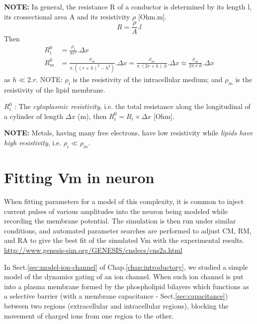 \begin{mdframed}

{\bf NOTE:} In general, the resistance R of a conductor is determined
by its length l, its crossectional area A and its resistivity $\rho$
[Ohm.m].
\begin{equation}
  R = \frac{\rho}{A}.l
\end{equation}
Then
\begin{equation}
  \label{eq:resistance}
  \begin{split}
R_i^0 &= \frac{\rho_i}{\pi r^2}.\Delta x \\
R_m^0 &= \frac{\rho_m}{\pi.((r+h)^2-h^2)}.\Delta x 
= \frac{\rho_m}{\pi.(2r+h).h}.\Delta x
\approx \frac{\rho_m}{2\pi.r.h}.\Delta x
\end{split}
\end{equation}
as $h \ll 2.r$. NOTE: $\rho_i$ is the resistivity of the intracellular medium;
and $\rho_m$ is the resistivity of the lipid membrane.

$R_i^0$ : The  {\it cytoplasmic resistivity}, i.e. the total resistance along
the longitudinal of a cylinder of length $\Delta x$ (m), then 
$R_i^0 = R_i\times \Delta  x$ [Ohm].

{\bf NOTE:} Metals, having many free electrons, have low resistivity while
{\it lipids have high resistivity}, i.e. $\rho_i \ll \rho_m$.
\end{mdframed}

\section{Fitting Vm in neuron}


When fitting parameters for a model of this complexity, it is common to inject
current pulses of various amplitudes into the neuron being modeled while
recording the membrane potential. The simulation is then run under similar
conditions, and automated parameter searches are performed to adjust CM, RM, and
RA to give the best fit of the simulated Vm with the experimental results.
\url{http://www.genesis-sim.org/GENESIS/cnslecs/cns2a.html}

In Sect.\ref{sec:model-ion-channel} of Chap.\ref{chap:introductory}, we studied
a simple model of the dynamics gating of an ion channel.
When such ion channel is put into a plasma membrane formed by the phospholipid
bilayers which functions as a selective barrier (with a membrane capacitance -
Sect.\ref{sec:capacitance}) between two regions (extracellular and intracellular
regions), blocking the movement of charged ions from one region to the other.

